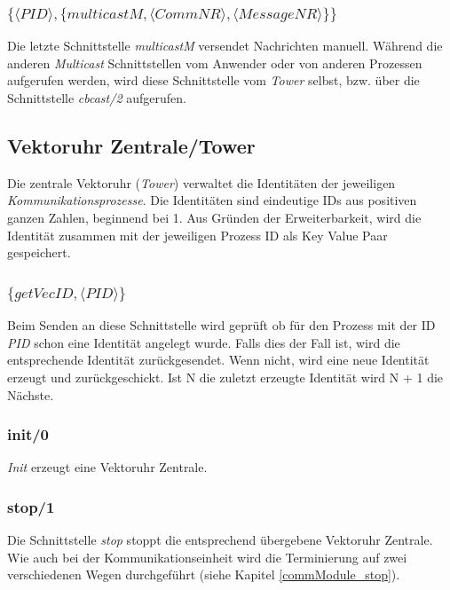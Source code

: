 \subsubsection{$\{\langle PID\rangle,\{multicastM,\langle CommNR\rangle,\langle MessageNR\rangle\}\}$}

Die letzte Schnittstelle \textit{multicastM} versendet Nachrichten manuell. Während die anderen \textit{Multicast} Schnittstellen vom Anwender oder von anderen Prozessen aufgerufen werden, wird diese Schnittstelle vom \textit{Tower} selbst, bzw. über die Schnittstelle \textit{cbcast/2} aufgerufen.

\subsection{Vektoruhr Zentrale/Tower} \label{tower}

Die zentrale Vektoruhr (\textit{Tower}) verwaltet die Identitäten der jeweiligen \textit{Kommunikationsprozesse}. Die Identitäten sind eindeutige IDs aus positiven ganzen Zahlen, beginnend bei 1.
Aus Gründen der Erweiterbarkeit, wird die Identität zusammen mit der jeweiligen Prozess ID als Key Value Paar gespeichert.

\subsubsection{$\{getVecID,\langle PID\rangle\}$}

Beim Senden an diese Schnittstelle wird geprüft ob für den Prozess mit der ID \textit{PID} schon eine Identität angelegt wurde. Falls dies der Fall ist, wird die entsprechende Identität zurückgesendet. Wenn nicht, wird eine neue Identität erzeugt und zurückgeschickt. Ist N die zuletzt erzeugte Identität wird N + 1 die Nächste.

\subsubsection{init/0}

\textit{Init} erzeugt eine Vektoruhr Zentrale.

\subsubsection{stop/1}

Die Schnittstelle \textit{stop} stoppt die entsprechend übergebene Vektoruhr Zentrale. Wie auch bei der Kommunikationseinheit wird die Terminierung auf zwei verschiedenen Wegen durchgeführt (siehe Kapitel \ref{commModule_stop}).

